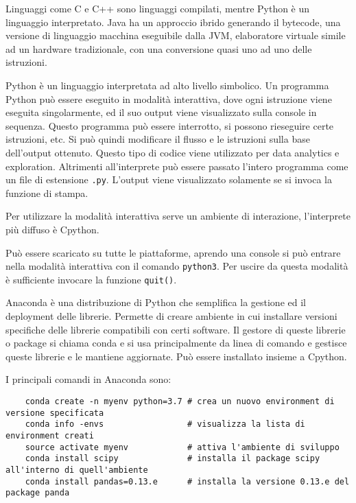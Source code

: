 \documentclass{article}
\numberwithin{equation}{subsection}
\begin{document}
Linguaggi come C e C++ sono linguaggi compilati, mentre Python è un linguaggio interpretato. 
Java ha un approccio ibrido generando il bytecode, una versione di linguaggio macchina eseguibile 
dalla JVM, elaboratore virtuale simile ad un hardware tradizionale, con una conversione 
quasi uno ad uno delle istruzioni. 

Python è un linguaggio interpretata ad alto livello simbolico. Un programma Python può 
essere eseguito in modalità interattiva, dove ogni istruzione viene eseguita singolarmente, 
ed il suo output viene visualizzato sulla console in sequenza. Questo programma può essere 
interrotto, si possono rieseguire certe istruzioni, etc. Si può quindi modificare il flusso 
e le istruzioni sulla base dell'output ottenuto. Questo tipo di codice viene utilizzato 
per data analytics e exploration. 
Altrimenti all'interprete può essere passato l'intero programma come un file di estensione \verb|.py|. 
L'output viene visualizzato solamente se si invoca la funzione di stampa. 

Per utilizzare la modalità interattiva serve un ambiente di interazione, l'interprete 
più diffuso è Cpython. 

Può essere scaricato su tutte le piattaforme, aprendo una console si può entrare nella modalità interattiva con il comando \verb|python3|. 
Per uscire da questa modalità è sufficiente invocare la funzione \verb|quit()|. 

Anaconda è una distribuzione di Python che semplifica la gestione ed il deployment delle librerie. Permette di creare ambiente 
in cui installare versioni specifiche delle librerie compatibili con certi software. Il gestore di queste librerie o package 
si chiama conda e si usa principalmente da linea di comando e gestisce queste librerie e le mantiene aggiornate. Può essere 
installato insieme a Cpython. 

I principali comandi in Anaconda sono:
\begin{verbatim}
    conda create -n myenv python=3.7 # crea un nuovo environment di versione specificata
    conda info -envs                 # visualizza la lista di environment creati
    source activate myenv            # attiva l'ambiente di sviluppo
    conda install scipy              # installa il package scipy all'interno di quell'ambiente
    conda install pandas=0.13.e      # installa la versione 0.13.e del package panda 
\end{verbatim}

\end{document}
